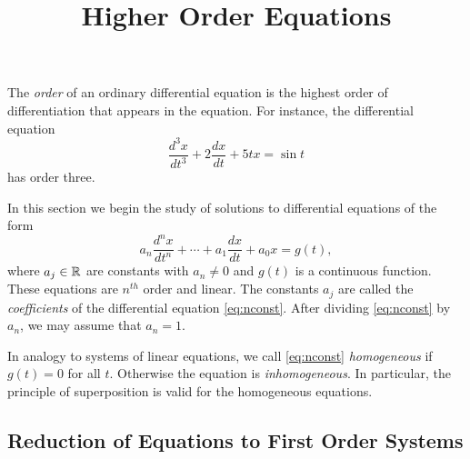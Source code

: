 \documentclass{ximera}
\title{Higher Order Equations}
\begin{document}
\begin{abstract}
\end{abstract}
\maketitle


\label{sec:HighOrder}

The {\em order\/} of an ordinary differential equation is the highest 
order of differentiation that appears in the equation.  For instance, 
the differential equation  
\[
\frac{d^3x}{dt^3} + 2\frac{dx}{dt}+ 5tx = \sin t
\]
has order three. 

In this section we begin the study of solutions to differential equations 
of the form
\begin{equation}  \label{eq:nconst}
a_n\frac{d^nx}{dt^n} + \cdots + a_1\frac{dx}{dt}+a_0x = g(t),
\end{equation}
where $a_j\in\mbox{$\Bbb{R}$}$ are constants with $a_n\neq 0$ and $g(t)$ is a 
continuous function. These equations are $n^{th}$ order and linear. 
The constants $a_j$ are called the 
{\em coefficients\/} of the 
differential equation \eqref{eq:nconst}.  After dividing \eqref{eq:nconst} by 
$a_n$, we may assume that $a_n=1$.  

In analogy to systems of linear equations, we call \eqref{eq:nconst} 
{\em homogeneous\/} if $g(t)=0$ for all $t$.  Otherwise the equation is 
{\em inhomogeneous}.   In particular, the principle of superposition is 
valid for the homogeneous equations.    

\subsection*{Reduction of Equations to First Order Systems}
\end{document}
